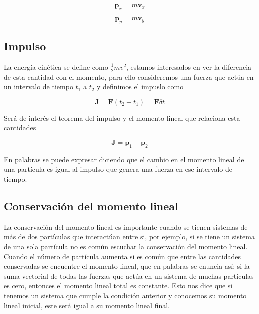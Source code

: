 \documentclass{article}
\begin{document}
\begin{equation}
   \textbf{p}_{x}=m\textbf{v}_{x}
\end{equation}

\begin{equation}
   \textbf{p}_{y}=m\textbf{v}_{y}
\end{equation}

\subsection{Impulso}

La energía cinética se define como $\frac{1}{2}mv^{2}$, estamos interesados en ver la diferencia de esta cantidad con el momento, para ello consideremos una fuerza que actúa en un intervalo de tiempo $t_{1}$ a  $t_{2}$  y definimos el impuslo como

\begin{equation}
   \textbf{J}=\textbf{F} (t_{2}-t_{1}) = \textbf{F}\delta t
\end{equation}

Será de interés el teorema del impulso y el momento lineal que relaciona esta cantidades

\begin{equation}
   \textbf{J}=\textbf{p}_{1} - \textbf{p}_{2}
\end{equation}

En palabras se puede expresar diciendo que el cambio en el momento lineal de una partícula es igual al impulso que genera una fuerza en ese intervalo de tiempo.

\subsection{Conservación del momento lineal}

La conservación del momento lineal es importante cuando se tienen sistemas de más de dos partículas que interactúan entre si, por ejemplo, si se tiene un sistema de una sola partícula no es común escuchar la conservación del momento lineal. Cuando el número de partícula aumenta si es común que entre las cantidades conservadas se encuentre el momento lineal, que en palabras se enuncia así: si la suma vectorial de todas las fuerzas que actúa en un sistema de muchas partículas es cero, entonces el momento lineal total es constante. Esto nos dice que si tenemos un sistema que cumple la condición anterior y conocemos su momento lineal inicial, este será igual a su momento lineal final.
\end{document}

